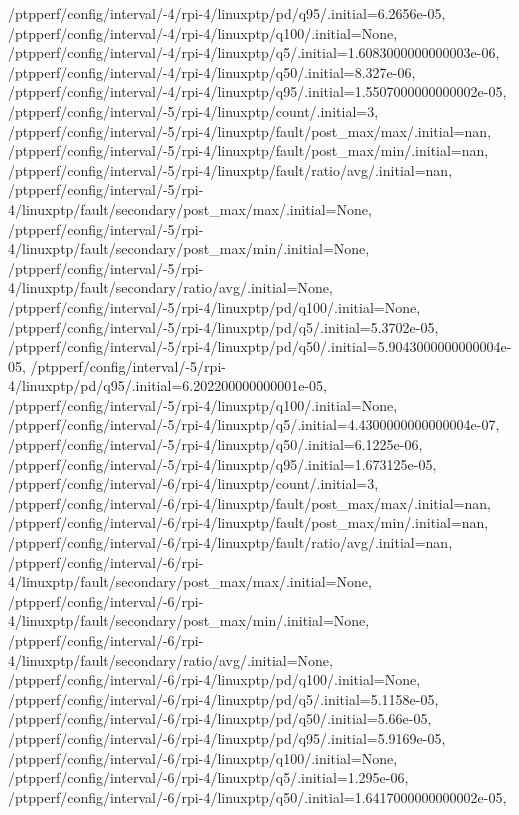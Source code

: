 {    /ptpperf/config/interval/-4/rpi-4/linuxptp/pd/q95/.initial=6.2656e-05,
    /ptpperf/config/interval/-4/rpi-4/linuxptp/q100/.initial=None,
    /ptpperf/config/interval/-4/rpi-4/linuxptp/q5/.initial=1.6083000000000003e-06,
    /ptpperf/config/interval/-4/rpi-4/linuxptp/q50/.initial=8.327e-06,
    /ptpperf/config/interval/-4/rpi-4/linuxptp/q95/.initial=1.5507000000000002e-05,
    /ptpperf/config/interval/-5/rpi-4/linuxptp/count/.initial=3,
    /ptpperf/config/interval/-5/rpi-4/linuxptp/fault/post_max/max/.initial=nan,
    /ptpperf/config/interval/-5/rpi-4/linuxptp/fault/post_max/min/.initial=nan,
    /ptpperf/config/interval/-5/rpi-4/linuxptp/fault/ratio/avg/.initial=nan,
    /ptpperf/config/interval/-5/rpi-4/linuxptp/fault/secondary/post_max/max/.initial=None,
    /ptpperf/config/interval/-5/rpi-4/linuxptp/fault/secondary/post_max/min/.initial=None,
    /ptpperf/config/interval/-5/rpi-4/linuxptp/fault/secondary/ratio/avg/.initial=None,
    /ptpperf/config/interval/-5/rpi-4/linuxptp/pd/q100/.initial=None,
    /ptpperf/config/interval/-5/rpi-4/linuxptp/pd/q5/.initial=5.3702e-05,
    /ptpperf/config/interval/-5/rpi-4/linuxptp/pd/q50/.initial=5.9043000000000004e-05,
    /ptpperf/config/interval/-5/rpi-4/linuxptp/pd/q95/.initial=6.202200000000001e-05,
    /ptpperf/config/interval/-5/rpi-4/linuxptp/q100/.initial=None,
    /ptpperf/config/interval/-5/rpi-4/linuxptp/q5/.initial=4.4300000000000004e-07,
    /ptpperf/config/interval/-5/rpi-4/linuxptp/q50/.initial=6.1225e-06,
    /ptpperf/config/interval/-5/rpi-4/linuxptp/q95/.initial=1.673125e-05,
    /ptpperf/config/interval/-6/rpi-4/linuxptp/count/.initial=3,
    /ptpperf/config/interval/-6/rpi-4/linuxptp/fault/post_max/max/.initial=nan,
    /ptpperf/config/interval/-6/rpi-4/linuxptp/fault/post_max/min/.initial=nan,
    /ptpperf/config/interval/-6/rpi-4/linuxptp/fault/ratio/avg/.initial=nan,
    /ptpperf/config/interval/-6/rpi-4/linuxptp/fault/secondary/post_max/max/.initial=None,
    /ptpperf/config/interval/-6/rpi-4/linuxptp/fault/secondary/post_max/min/.initial=None,
    /ptpperf/config/interval/-6/rpi-4/linuxptp/fault/secondary/ratio/avg/.initial=None,
    /ptpperf/config/interval/-6/rpi-4/linuxptp/pd/q100/.initial=None,
    /ptpperf/config/interval/-6/rpi-4/linuxptp/pd/q5/.initial=5.1158e-05,
    /ptpperf/config/interval/-6/rpi-4/linuxptp/pd/q50/.initial=5.66e-05,
    /ptpperf/config/interval/-6/rpi-4/linuxptp/pd/q95/.initial=5.9169e-05,
    /ptpperf/config/interval/-6/rpi-4/linuxptp/q100/.initial=None,
    /ptpperf/config/interval/-6/rpi-4/linuxptp/q5/.initial=1.295e-06,
    /ptpperf/config/interval/-6/rpi-4/linuxptp/q50/.initial=1.6417000000000002e-05,
}
